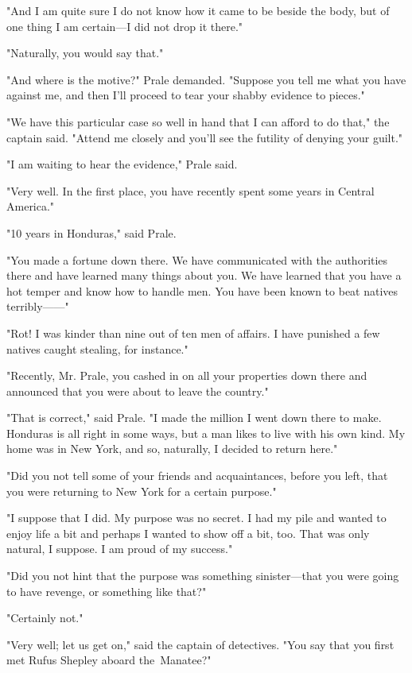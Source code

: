 \documentclass{novel}
\begin{document}
"And I am quite sure I do not know how it came to be beside the body, but of one thing I am certain---I did not drop it there."

"Naturally, you would say that."

"And where is the motive?" Prale demanded. "Suppose you tell me what you have against me, and then I'll proceed to tear your shabby evidence to pieces."

"We have this particular case so well in hand that I can afford to do that," the captain said. "Attend me closely and you'll see the futility of denying your guilt."

"I am waiting to hear the evidence," Prale said.

"Very well. In the first place, you have recently spent some years in Central America."

"10 years in Honduras," said Prale.

"You made a fortune down there. We have communicated with the authorities there and have learned many things about you. We have learned that you have a hot temper and know how to handle men. You have been known to beat natives terribly------"

"Rot! I was kinder than nine out of ten men of affairs. I have punished a few natives caught stealing, for instance."

"Recently, Mr. Prale, you cashed in on all your properties down there and announced that you were about to leave the country."

"That is correct," said Prale. "I made the million I went down there to make. Honduras is all right in some ways, but a man likes to live with his own kind. My home was in New York, and so, naturally, I decided to return here."

"Did you not tell some of your friends and acquaintances, before you left, that you were returning to New York for a certain purpose."

"I suppose that I did. My purpose was no secret. I had my pile and wanted to enjoy life a bit and perhaps I wanted to show off a bit, too. That was only natural, I suppose. I am proud of my success."

"Did you not hint that the purpose was something sinister---that you were going to have revenge, or something like that?"

"Certainly not."

"Very well; let us get on," said the captain of detectives. "You say that you first met Rufus Shepley aboard the Manatee?"
\end{document}
